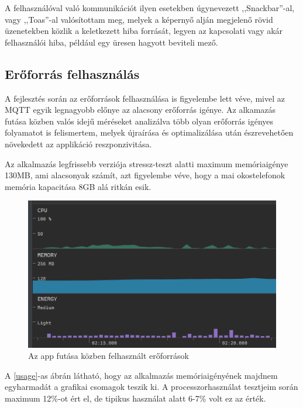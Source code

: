 \documentclass[
]{thesis-ekf}
\theoremstyle{definition}
\theoremstyle{remark}
\begin{document}
A felhasználóval való kommunikációt ilyen esetekben úgynevezett ,,Snackbar''-al, vagy ,,Toas''-al
valósítottam meg, melyek a képernyő alján megjelenő rövid üzenetekben közlik a keletkezett hiba forrását, legyen az
kapcsolati vagy akár felhasználói hiba, például egy üresen hagyott beviteli mező.

\subsection{Erőforrás felhasználás}
A fejlesztés során az erőforrások felhasználása is figyelembe lett véve, mivel az MQTT egyik legnagyobb előnye
az alacsony erőforrás igénye. Az alkamazás futása közben valós idejű méréseket analizálva több olyan
erőforrás igényes folyamatot is felismertem, melyek újraírása és optimalizálása után észrevehetően növekedett
az applikáció reszponzivitása.

Az alkalmazás legfrissebb verziója stressz-teszt alatti maximum memóriaigénye 130MB, ami alacsonyak számít, azt
figyelembe véve, hogy a mai okostelefonok memória kapacitása 8GB alá ritkán esik.
\begin{figure}[h]
	\centering
	\label{profiler}
	\includegraphics{images/profiler.png}
	\caption{Az app futása közben felhasznált erőforrások}
\end{figure}

A \ref{usage}-as ábrán látható, hogy az alkalmazás memóriaigényének majdnem egyharmadát a grafikai csomagok teszik ki.
A processzorhasználat tesztjeim során maximum 12\%-ot ért el, de tipikus használat alatt 6-7\% volt ez az érték.
\end{document}
